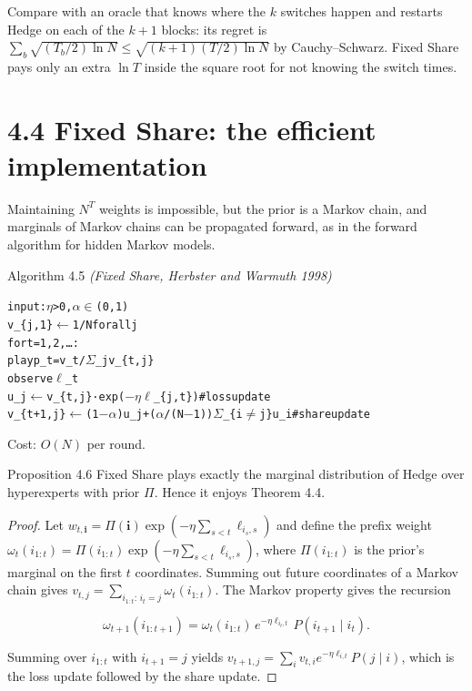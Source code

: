 \documentclass[11pt,a4paper,openany]{book}
\newenvironment{algo}{\par\smallskip\begingroup\footnotesize\begin{alltt}}{\end{alltt}\endgroup\smallskip}
\begin{document}
Compare with an oracle that knows where the $k$ switches happen and restarts Hedge on each of the $k+1$ blocks: its regret is $\sum_{b}\sqrt{(T_b/2)\ln N}\le\sqrt{(k+1)(T/2)\ln N}$ by Cauchy–Schwarz. Fixed Share pays only an extra $\ln T$ inside the square root for not knowing the switch times.

\section*{4.4 Fixed Share: the efficient implementation}\label{ch4-fixedshare}

Maintaining $N^T$ weights is impossible, but the prior is a Markov chain, and marginals of Markov chains can be propagated forward, as in the forward algorithm for hidden Markov models.

\begin{balg}{Algorithm 4.5 \emph{(Fixed Share, Herbster and Warmuth 1998)}}
\begin{algo}
input: \ensuremath{\eta} > 0, \ensuremath{\alpha} \ensuremath{\in} (0,1)
v\_\{j,1\} \ensuremath{\leftarrow} 1/N for all j
for t = 1, 2, …:
    play p\_t = v\_t / \ensuremath{\Sigma}\_j v\_\{t,j\}
    observe \ensuremath{\ell}\_t
    u\_j \ensuremath{\leftarrow} v\_\{t,j\} · exp(\ensuremath{-}\ensuremath{\eta} \ensuremath{\ell}\_\{j,t\})                 \# loss update
    v\_\{t+1,j\} \ensuremath{\leftarrow} (1\ensuremath{-}\ensuremath{\alpha}) u\_j + (\ensuremath{\alpha}/(N\ensuremath{-}1)) \ensuremath{\Sigma}\_\{i\ensuremath{\neq}j\} u\_i    \# share update
\end{algo}

Cost: $O(N)$ per round.
\end{balg}

\begin{bthm}{Proposition 4.6}
Fixed Share plays exactly the marginal distribution of Hedge over hyperexperts with prior $\Pi$. Hence it enjoys Theorem 4.4.
\end{bthm}

\begin{proof}
Let $w_{t,\mathbf i}=\Pi(\mathbf i)\exp(-\eta\sum_{s<t}\ell_{i_s,s})$ and define the prefix weight $\omega_t(i_{1:t})=\Pi(i_{1:t})\exp(-\eta\sum_{s<t}\ell_{i_s,s})$, where $\Pi(i_{1:t})$ is the prior's marginal on the first $t$ coordinates. Summing out future coordinates of a Markov chain gives $v_{t,j}=\sum_{i_{1:t}:\,i_t=j}\omega_t(i_{1:t})$. The Markov property gives the recursion

\[\omega_{t+1}(i_{1:t+1})=\omega_t(i_{1:t})\,e^{-\eta\ell_{i_t,t}}\,P(i_{t+1}\mid i_t).\]

Summing over $i_{1:t}$ with $i_{t+1}=j$ yields $v_{t+1,j}=\sum_iv_{t,i}e^{-\eta\ell_{i,t}}P(j\mid i)$, which is the loss update followed by the share update.
\end{proof}
\end{document}
